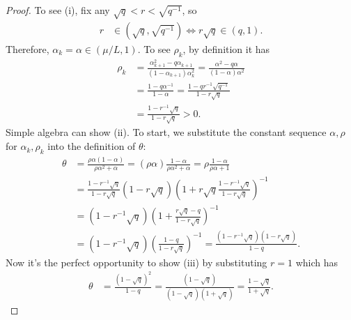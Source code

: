 \documentclass[12pt]{article}
\begin{document}
    \begin{proof}
        To see (i), fix any $\sqrt{q} < r < \sqrt{q^{-1}}$, so
        \begin{align*}
            r &\in \left(\sqrt{q}, \sqrt{q^{-1}}\right)
            \iff
            r\sqrt{q} \in
            \left(
                q, 1
            \right).
        \end{align*}
        Therefore, $\alpha_k = \alpha \in (\mu/L, 1)$.
        To see $\rho_k$, by definition it has
        \begin{align*}
            \rho_k &= \frac{\alpha_{k + 1}^2 - q \alpha_{k + 1}}{(1 - \alpha_{k + 1})\alpha_k^2}
            = \frac{\alpha^2 - q \alpha}{(1 - \alpha)\alpha^2}
            \\
            &= \frac{1 - q\alpha^{-1}}{1 - \alpha}
            = \frac{1 - q r^{-1}\sqrt{q^{-1}}}{1 - r \sqrt{q}}
            \\
            &= \frac{1 - r^{-1}\sqrt{q}}{1 - r \sqrt{q}} > 0.
        \end{align*}
        Simple algebra can show (ii).
        To start, we substitute the constant sequence $\alpha, \rho$ for $\alpha_k, \rho_k$ into the definition of $\theta$:
        \begin{align*}
            \theta &= \frac{\rho\alpha(1 - \alpha)}{\rho \alpha^2 + \alpha}
            = (\rho\alpha)\frac{1 - \alpha}{\rho \alpha^2 + \alpha} = \rho \frac{1 - \alpha}{\rho \alpha + 1}
            \\
            &=
            \frac{1 - r^{-1}\sqrt{q}}{1 - r \sqrt{q}}
            (1 - r\sqrt{q})
            \left(
                1 + r\sqrt{q}\frac{1 - r^{-1}\sqrt{q}}{1 - r \sqrt{q}}
            \right)^{-1}
            \\
            &= (1 - r^{-1} \sqrt{q})\left(
                1 + \frac{r \sqrt{q} - q}{1 - r \sqrt{q}}
            \right)^{-1}
            \\
            &= \left(1 - r^{-1} \sqrt{q}\right)\left(
                \frac{1 - q}{1 - r \sqrt{q}}
            \right)^{-1} = \frac{(1 - r^{-1}\sqrt{q})(1 - r \sqrt{q})}{1 - q}.
        \end{align*}
        Now it's the perfect opportunity to show (iii) by substituting $r = 1$ which has
        \begin{align*}
            \theta &= \frac{(1 - \sqrt{q})^2}{1 - q}
            =
            \frac{(1 - \sqrt{q})}{(1 - \sqrt{q})(1 + \sqrt{q})}
            = \frac{1 - \sqrt{q}}{1 + \sqrt{q}}.
        \end{align*}

\end{proof}
\end{document}
